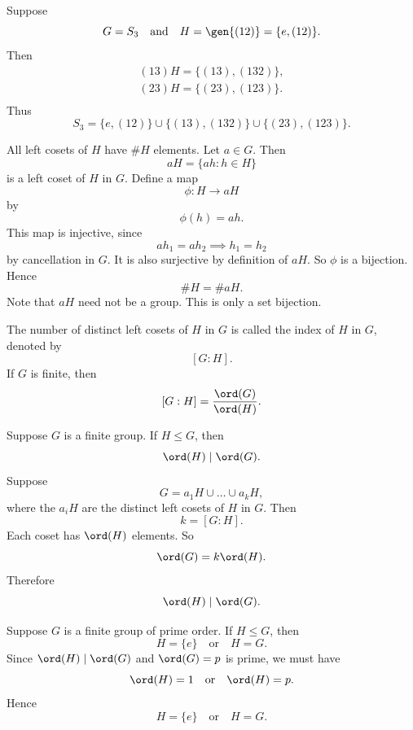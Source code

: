 Suppose
\[
    G=S_3
    \quad\text{and}\quad
    H=\gen{(12)}=\{e,(12)\}.
\]
Then
\begin{gather*}
    (13)H=\{(13),(132)\},\\
    (23)H=\{(23),(123)\}.\\
\end{gather*}
Thus
\[
    S_3=\{e,(12)\}\cup\{(13),(132)\}\cup\{(23),(123)\}.
\]
\begin{proposition}{
    All left cosets of $H$ have $\#H$ elements.
}
    Let $a\in G$.
    Then
    \[
        aH=\{ah:h\in H\}
    \]
    is a left coset of $H$ in $G$.
    Define a map
    \[
        \phi:H\to aH
    \]
    by
    \[
        \phi(h)=ah.
    \]
    This map is injective, since
    \[
        ah_1=ah_2 \implies h_1=h_2
    \]
    by cancellation in $G$.
    It is also surjective by definition of $aH$.
    So $\phi$ is a bijection.
    Hence
    \[
        \#H=\#aH.
    \]
    Note that $aH$ need not be a group.
    This is only a set bijection.
\end{proposition}

\begin{definition}[Index of $H$ in $G$]
    The number of distinct left cosets of $H$ in $G$ is called the index of $H$ in $G$, denoted by
    \[
        [G:H].
    \]
    If $G$ is finite, then
    \[
        [G:H]=\frac{\ord(G)}{\ord(H)}.
    \]
\end{definition}

\begin{theorem}{
    Suppose $G$ is a finite group.
    If $H\leq G$, then
    \[
        \ord(H)\mid \ord(G).
    \]
}
    Suppose
    \[
        G=a_{1}H\cup\dots\cup a_{k}H,
    \]
    where the $a_{i}H$ are the distinct left cosets of $H$ in $G$.
    Then
    \[
        k=[G:H].
    \]
    Each coset has $\ord(H)$ elements.
    So
    \[
        \ord(G)=k\ord(H).
    \]
    Therefore
    \[
        \ord(H)\mid \ord(G).
    \]
\end{theorem}

\begin{corollary}{
    Suppose $G$ is a finite group of prime order.
    If $H\leq G$, then
    \[
        H=\{e\}
        \quad\text{or}\quad
        H=G.
    \]
}
    Since $\ord(H)\mid \ord(G)$ and $\ord(G)=p$ is prime, we must have
    \[
        \ord(H)=1
        \quad\text{or}\quad
        \ord(H)=p.
    \]
    Hence
    \[
        H=\{e\}
        \quad\text{or}\quad
        H=G.
    \]
\end{corollary}

